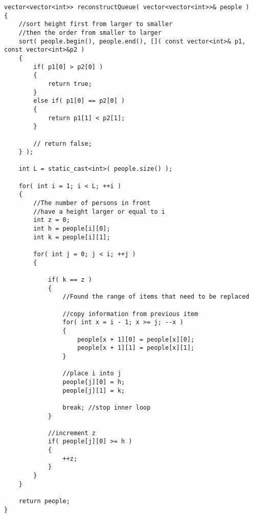 \begin{lstlisting}[style=customc, caption={Sorting}]
vector<vector<int>> reconstructQueue( vector<vector<int>>& people )
{
    //sort height first from larger to smaller
    //then the order from smaller to larger
    sort( people.begin(), people.end(), []( const vector<int>& p1, const vector<int>&p2 )
    {
        if( p1[0] > p2[0] )
        {
            return true;
        }
        else if( p1[0] == p2[0] )
        {
            return p1[1] < p2[1];
        }

        // return false;
    } );

    int L = static_cast<int>( people.size() );

    for( int i = 1; i < L; ++i )
    {
        //The number of persons in front
        //have a height larger or equal to i
        int z = 0;
        int h = people[i][0];
        int k = people[i][1];

        for( int j = 0; j < i; ++j )
        {

            if( k == z )
            {
                //Found the range of items that need to be replaced

                //copy information from previous item
                for( int x = i - 1; x >= j; --x )
                {
                    people[x + 1][0] = people[x][0];
                    people[x + 1][1] = people[x][1];
                }

                //place i into j
                people[j][0] = h;
                people[j][1] = k;

                break; //stop inner loop
            }

            //increment z
            if( people[j][0] >= h )
            {
                ++z;
            }
        }
    }

    return people;
}
\end{lstlisting}